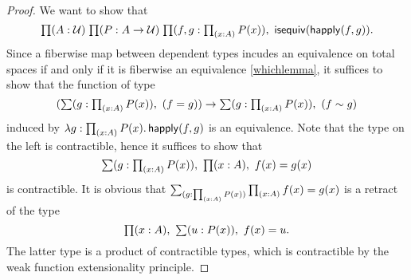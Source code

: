 \begin{proof}
We want to show that
\begin{equation*}
\prd{A:\type}{P:A\to\type}{f,g:\prd{x:A}P(x)}\isequiv(\happly (f,g)).
\end{equation*}
Since a fiberwise map between dependent types incudes an equivalence on total spaces
if and only if it is fiberwise an equivalence \autoref{whichlemma}, it suffices to show that the function of type
\begin{equation*}
(\sm{g:\prd{x:A}P(x)}(f= g)) \to \sm{g:\prd{x:A}P(x)}(f\htpy g)
\end{equation*}
induced by $\lam{g : \prd{x:A}P(x)} \happly (f,g)$ is an equivalence. Note that the type on the left is contractible, hence it suffices to show that
\begin{equation*}
\sm{g:\prd{x:A}P(x)}\prd{x:A}f(x)= g(x)
\end{equation*}
is contractible. It is obvious that $\sm{g:\prd{x:A}P(x)}\prd{x:A}f(x)= g(x)$ is a retract of the type
\begin{equation*}
\prd{x:A}\sm{u:P(x)}f(x)= u.
\end{equation*}
The latter type is a product of contractible types, which is contractible by the weak function extensionality principle.
\end{proof}


